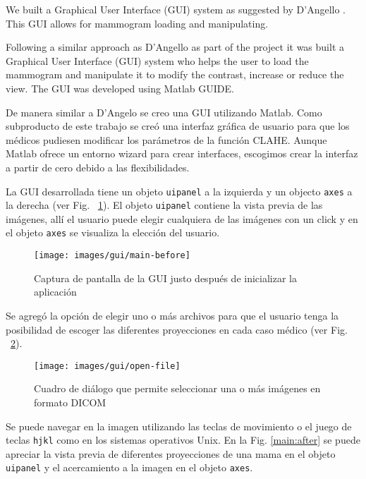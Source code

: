 
We built a Graphical User Interface (GUI) system as suggested by  D'Angello
\cite{d2007design}. This GUI allows for mammogram loading and manipulating. 

Following a similar approach as D'Angello \cite{d2007design} as part of the
project it was built a Graphical User Interface (GUI) system who helps the user
to load the mammogram and manipulate it to modify the contrast, increase or
reduce the view. The GUI was developed using Matlab GUIDE. 

De manera similar a D'Angelo \cite{d2007design} se creo una GUI utilizando
Matlab. Como subproducto de este trabajo se creó una interfaz gráfica de
usuario para que los médicos pudiesen modificar los parámetros de la función
CLAHE. Aunque Matlab ofrece un entorno wizard para crear interfaces, escogimos
crear la interfaz a partir de cero debido a las flexibilidades.

La GUI desarrollada tiene un objeto \texttt{uipanel} a la izquierda y un
objecto \texttt{axes} a la derecha (ver Fig. ~\ref{main:before}). El objeto
\texttt{uipanel} contiene la vista previa de las imágenes, allí el usuario
puede elegir cualquiera de las imágenes con un click y en el objeto
\texttt{axes} se visualiza la elección del usuario. 

\begin{figure}[h]
  \begin{center}
    {\texttt{[image: images/gui/main-before]}}
  \end{center}
  \caption[GUI: Inicio]{Captura de pantalla de la GUI justo después de inicializar la aplicación} 
  \label{main:before} 
\end{figure}

Se agregó la opción de elegir uno o más archivos para que el usuario tenga la
posibilidad de escoger las diferentes proyecciones en cada caso médico (ver
Fig. ~\ref{fig:openfile}).

\begin{figure}[h]
  \begin{center}
    {\texttt{[image: images/gui/open-file]}}
  \end{center}
  \caption[GUI: Selección de archivos]
  {Cuadro de diálogo que permite seleccionar una o más imágenes en formato DICOM} 
  \label{fig:openfile} 
\end{figure}

Se puede navegar en la imagen utilizando las teclas de movimiento o el juego de
teclas \texttt{hjkl} como en los sistemas operativos Unix. En la Fig.
\ref{main:after} se puede apreciar la vista previa de diferentes proyecciones
de una mama en el objeto \texttt{uipanel} y el acercamiento a la imagen en el
objeto \texttt{axes}.

